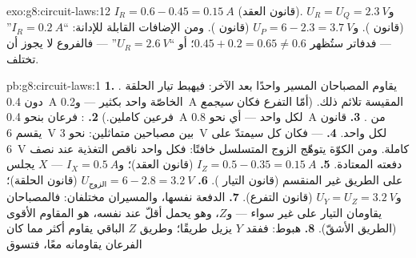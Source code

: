 \begin{solution}{exo:g8:circuit-laws:12}
$I_R = 0.6 - 0.45 = \qty{0.15}{A}$ (قانون العقد). و$U_R = U_Q
= \qty{2.3}{V}$ (قانون  ). و$U_P = 6 - 2.3 =
\qty{3.7}{V}$ (قانون  ). ومن الإضافات
القابلة للإدانة: ``$I_R = \qty{0.2}{A}$'' --- فدفاتر 
ستُظهر $0.45 + 0.2 = 0.65 \neq 0.6$؛ أو ``$U_R = \qty{2.6}{V}$''
--- فالفروع  لا يجوز أن تختلف.
\end{solution}

\begin{solution}{pb:g8:circuit-laws:1}
\textbf{1.} .  يقاوم المصباحان المسير
واحدًا بعد الآخر: فيهبط تيار الحلقة دون \qty{0.4}{A} الخاصّة
 واحد بكثير --- و\qty{0.2}{A} المقيسة تلائم ذلك. (أمّا
التفرع فكان \emph{سيجمع} فرعين كاملين.)
\textbf{2.} : فرعان بنحو \qty{0.4}{A} لكل واحد ---
أي نحو \qty{0.8}{A} من .
\textbf{3.} قانون   يقسم \qty{6}{V} بين
مصباحين متماثلين: نحو \qty{3}{V} لكل واحد.
\textbf{4.}  --- فكان كل  سيمتدّ على \qty{6}{V}
كاملة. ومن الكوّة يتوهّج الزوج المتسلسل خافتًا: فكل واحد ناقص
التغذية عند نصف دفعته المعتادة.
\textbf{5.} $I_Z = 0.5 - 0.35 = \qty{0.15}{A}$ (قانون العقد)؛
و$I_X = \qty{0.5}{A}$ ---  $X$ يجلس على الطريق غير المنقسم
(قانون التيار ).
\textbf{6.} $U_{\text{الزوج}} = 6 - 2.8 = \qty{3.2}{V}$ (قانون
الحلقة)؛ و$U_Y = U_Z = \qty{3.2}{V}$ (قانون التفرع).
\textbf{7.} الدفعة نفسها، والمسيران مختلفان: فالمصباحان
يقاومان التيار على غير سواء --- و$Z$، وهو يحمل أقلّ عند 
نفسه، هو المقاوم الأقوى (الطريق الأشقّ).
\textbf{8.} هبوط: ففقد  $Y$ يزيل طريقًا؛ وطريق $Z$ الباقي
يقاوم أكثر مما كان الفرعان يقاومانه معًا، فتسوق 

\end{solution}
